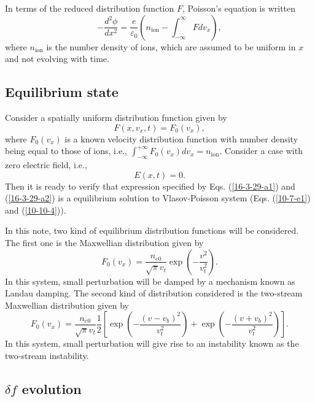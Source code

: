 \documentclass{article}
\newcommand{\tmop}[1]{\ensuremath{\operatorname{#1}}}
\begin{document}
In terms of the reduced distribution function $F$, Poisson's equation is
written
\begin{equation}
  \label{10-10-4} - \frac{d^2 \phi}{d x^2} = \frac{e}{\varepsilon_0} \left(
  n_{\tmop{ion}} - \int_{- \infty}^{\infty} F d v_x \right),
\end{equation}
where $n_{\tmop{ion}}$ is the number density of ions, which are assumed to be
uniform in $x$ and not evolving with time.

\subsection{Equilibrium state}

Consider a spatially uniform distribution function given by
\begin{equation}
  \label{16-3-29-a1} F (x, v_x, t) = F_0 (v_x),
\end{equation}
where $F_0 (v_x)$ is a known velocity distribution function with number
density being equal to those of ions, i.e., $\int_{- \infty}^{+ \infty} F_0
(v_x) d v_x = n_{\tmop{ion}}$. Consider a case with zero electric field, i.e.,
\begin{equation}
  \label{16-3-29-a2} E (x, t) = 0.
\end{equation}
Then it is ready to verify that expression specified by Eqs.
(\ref{16-3-29-a1}) and (\ref{16-3-29-a2}) is a equilibrium solution to
Vlasov-Poisson system (Eqs. (\ref{10-7-e1}) and (\ref{10-10-4})).

In this note, two kind of equilibrium distribution functions will be
considered. The first one is the Maxwellian distribution given by
\begin{equation}
  F_0 (v_x) = \frac{n_{e 0}}{\sqrt{\pi} v_t} \exp \left( - \frac{v^2}{v_t^2}
  \right) .
\end{equation}
In this system, small perturbation will be damped by a mechanism known as
Landau damping. The second kind of distribution considered is the two-stream
Maxwellian distribution given by
\begin{equation}
  F_0 (v_x) = \frac{n_{e 0}}{\sqrt{\pi} v_t}  \frac{1}{2} \left[ \exp \left( -
  \frac{(v - v_b)^2}{v_t^2} \right) + \exp \left( - \frac{(v + v_b)^2}{v_t^2}
  \right) \right] .
\end{equation}
In this system, small perturbation will give rise to an instability known as
the two-stream instability.

\subsection{$\delta f$ evolution}
\end{document}
